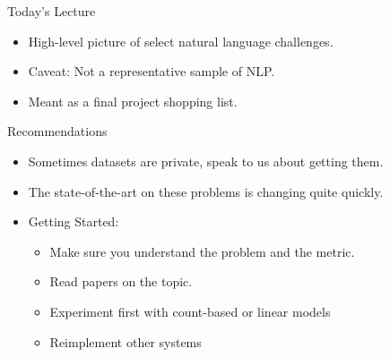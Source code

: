 \documentclass{beamer}
\begin{document}
\begin{frame}{Today's Lecture}
  \begin{itemize}
  \item High-level picture of select natural language challenges.
    \air

  \item Caveat: Not a representative sample of NLP.
    
    \air

  \item Meant as a final project shopping list.
  \end{itemize}
\end{frame}

\begin{frame}{Recommendations}
  \begin{itemize}
  \item Sometimes datasets are private, speak to us about getting them. 
    \air

  \item The state-of-the-art on these problems is changing quite quickly.
    \air 
    
  \item Getting Started: 
    \air 
    \begin{itemize}
    \item Make sure you understand the problem and the metric.
      \air
    \item Read papers on the topic.
      \air
    \item Experiment first with count-based or linear models
      \air
    \item Reimplement other systems
    \end{itemize}
  \end{itemize}
\end{frame}
\end{document}
